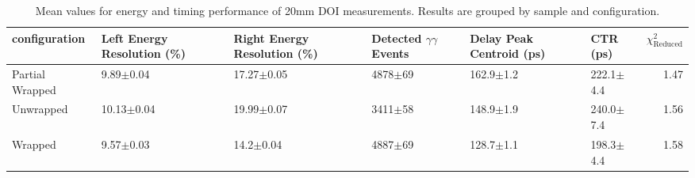 \begin{table}
\caption{\label{doictrresults-20} Mean values for energy and timing performance of 20mm DOI measurements. Results are grouped by sample and configuration.}
\begin{tabular}{llllllr}
\hline
configuration & Left Energy Resolution (\%) & Right Energy Resolution (\%) & Detected $\gamma\gamma$ Events & Delay Peak Centroid (ps)  & CTR (ps) &  $\chi^2_\text{Reduced}$ \\
\hline
Partial Wrapped   &        9.89$\pm$0.04 &   17.27$\pm$0.05 &  4878$\pm$69 &  162.9$\pm$1.2 &  222.1$\pm$4.4 &        1.47 \\
Unwrapped     &       10.13$\pm$0.04 &   19.99$\pm$0.07 &  3411$\pm$58 &  148.9$\pm$1.9 &  240.0$\pm$7.4 &        1.56 \\
Wrapped       &        9.57$\pm$0.03 &    14.2$\pm$0.04 &  4887$\pm$69 &  128.7$\pm$1.1 &  198.3$\pm$4.4 &        1.58 \\
\hline
\end{tabular}
\end{table}
